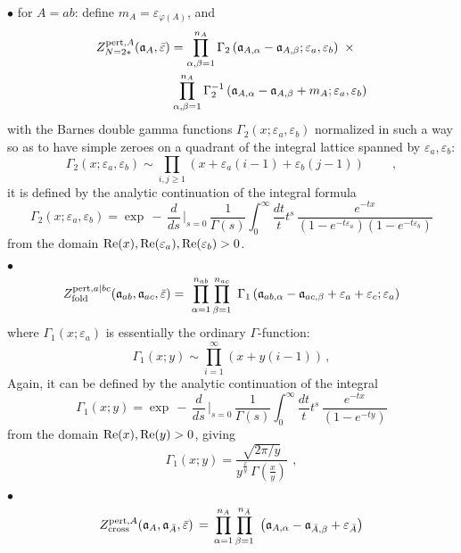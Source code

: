 \documentclass[12pt]{amsart}
\newcommand {\3}{\underline{\bf 3}}
\newcommand {\4}{\underline{\bf 4}}
\newcommand {\6}{\underline{\bf 6}}
\newcommand{\beq}{\begin{equation}}
\newcommand{\eeq}{\end{equation}}
\newcommand {\ac} {\mathfrak{a}}
\newcommand{\ve}{\varepsilon}
\begin{document}
$\bullet$ for $A = ab$: define $m_{A} = {\ve}_{{\varphi}(A)}$, and 
\beq
\begin{aligned}
& Z_{N=2*}^{{\rm pert}, A} ( {\bf\ac}_{A}, {\bar\ve} ) = 
\prod_{{\alpha}, {\beta} =1}^{n_{A}} {\Gamma}_{2} \left( 
{\ac}_{A, \alpha} - {\ac}_{A, \beta} ; {\ve}_{a}, {\ve}_{b} \right) \ \times \\
& \qquad\qquad\qquad  \prod_{{\alpha}, {\beta} =1}^{n_{A}} {\Gamma}_{2}^{-1} \left( 
{\ac}_{A, \alpha} - {\ac}_{A, \beta} + m_{A}; {\ve}_{a}, {\ve}_{b} \right)
\label{eq:zn2*}\end{aligned}
\eeq
with the Barnes double gamma functions ${\Gamma}_{2}(x; {\ve}_{a}, {\ve}_{b})$
normalized in such a way so as to have simple zeroes on a quadrant of the integral lattice spanned by ${\ve}_{a}, {\ve}_{b}$:
\beq
{\Gamma}_{2}(x; {\ve}_{a}, {\ve}_{b}) \sim \prod_{i, j \geq 1} \left( x + {\ve}_{a} (i-1) +{\ve}_{b}(j-1) \right)   \qquad \ , 
\eeq
it is defined by the analytic continuation of the integral formula
\beq
{\Gamma}_{2}(x; {\ve}_{a}, {\ve}_{b})  = {\exp} \, - \, \frac{d}{ds} \, \Biggr\vert_{s=0} \,\frac{1}{{\Gamma}(s)} \int_{0}^{\infty} \frac{dt}{t} t^{s} \, \frac{e^{-tx}}{(1-e^{-t{\ve}_{a}})(1-e^{-t{\ve}_{b}})}
\eeq
from the domain ${\rm Re}(x), {\rm Re}({\ve}_{a}), {\rm Re}({\ve}_{b}) > 0$. 



$\bullet$
\beq
Z^{{\rm pert}, a|bc}_{\rm fold} ({\bf\ac}_{ab}, {\bf\ac}_{ac}, {\bar\ve} ) =  \ \prod_{{\alpha}=1}^{n_{ab}}
\prod_{{\beta}=1}^{n_{ac}}\
{\Gamma}_{1} \left( {\ac}_{ab, \alpha} - {\ac}_{ac, \beta} + {\ve}_{a} + {\ve}_{c}; {\ve}_{a} \right)  
\eeq
where ${\Gamma}_{1}(x; {\ve}_{a})$ is essentially the ordinary $\Gamma$-function:
\beq
 {\Gamma}_{1}(x; y)  \sim \prod_{i=1}^{\infty} \left( x + y(i-1) \right) \, , 
\eeq
Again, it can be defined by the analytic continuation of the integral
\beq
{\Gamma}_{1}(x; y)  = {\exp} \, - \, \frac{d}{ds} \, \Biggr\vert_{s=0} \, \frac{1}{{\Gamma}(s)} \int_{0}^{\infty} \frac{dt}{t} t^{s} \, \frac{e^{-tx}}{(1-e^{-ty})}
\eeq
from the domain ${\rm Re}(x), {\rm Re}(y) > 0$, giving
\beq
{\Gamma}_{1}(x; y)  =  \frac{\sqrt{2\pi / y}}{y^{\frac{x}{y}}\, {\Gamma}\left( \frac{x}{y} \right)} \, \ , 
\label{eq:gamma1}
\eeq


$\bullet$
\beq
Z^{{\rm pert}, A}_{\rm cross}
( {\bf\ac}_{A}, {\bf\ac}_{\bar A} , {\bar\ve}) \, = \, \prod_{{\alpha}=1}^{n_{A}} \prod_{{\beta}= 1}^{n_{\bar A}} \ \left( {\ac}_{A, \alpha} - {\ac}_{{\bar A}, \beta} +
 {\ve}_{\bar A} \right) \eeq
 
\end{document}
